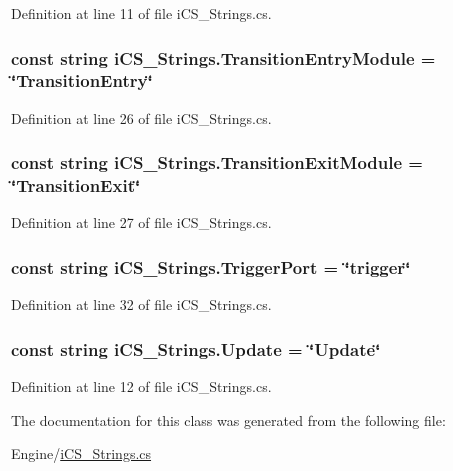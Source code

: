 Definition at line 11 of file i\+C\+S\+\_\+\+Strings.\+cs.

\hypertarget{classi_c_s___strings_ab1aa22ad8712151313c2f49998cd5b85}{
\subsubsection[{Transition\+Entry\+Module}]{\setlength{\rightskip}{0pt plus 5cm}const string i\+C\+S\+\_\+\+Strings.\+Transition\+Entry\+Module = \char`\"{}Transition\+Entry\char`\"{}}}\label{classi_c_s___strings_ab1aa22ad8712151313c2f49998cd5b85}


Definition at line 26 of file i\+C\+S\+\_\+\+Strings.\+cs.

\hypertarget{classi_c_s___strings_af84270952763bfdfe88274648fc3e3b9}{
\subsubsection[{Transition\+Exit\+Module}]{\setlength{\rightskip}{0pt plus 5cm}const string i\+C\+S\+\_\+\+Strings.\+Transition\+Exit\+Module = \char`\"{}Transition\+Exit\char`\"{}}}\label{classi_c_s___strings_af84270952763bfdfe88274648fc3e3b9}


Definition at line 27 of file i\+C\+S\+\_\+\+Strings.\+cs.

\hypertarget{classi_c_s___strings_a4ab12350fb1a94d27d6dd826ab2382f3}{
\subsubsection[{Trigger\+Port}]{\setlength{\rightskip}{0pt plus 5cm}const string i\+C\+S\+\_\+\+Strings.\+Trigger\+Port = \char`\"{}trigger\char`\"{}}}\label{classi_c_s___strings_a4ab12350fb1a94d27d6dd826ab2382f3}


Definition at line 32 of file i\+C\+S\+\_\+\+Strings.\+cs.

\hypertarget{classi_c_s___strings_abb1dc82f4805c6cd053b410e29782c65}{
\subsubsection[{Update}]{\setlength{\rightskip}{0pt plus 5cm}const string i\+C\+S\+\_\+\+Strings.\+Update = \char`\"{}Update\char`\"{}}}\label{classi_c_s___strings_abb1dc82f4805c6cd053b410e29782c65}


Definition at line 12 of file i\+C\+S\+\_\+\+Strings.\+cs.



The documentation for this class was generated from the following file\+:\begin{DoxyCompactItemize}
\item 
Engine/\hyperlink{i_c_s___strings_8cs}{i\+C\+S\+\_\+\+Strings.\+cs}\end{DoxyCompactItemize}
